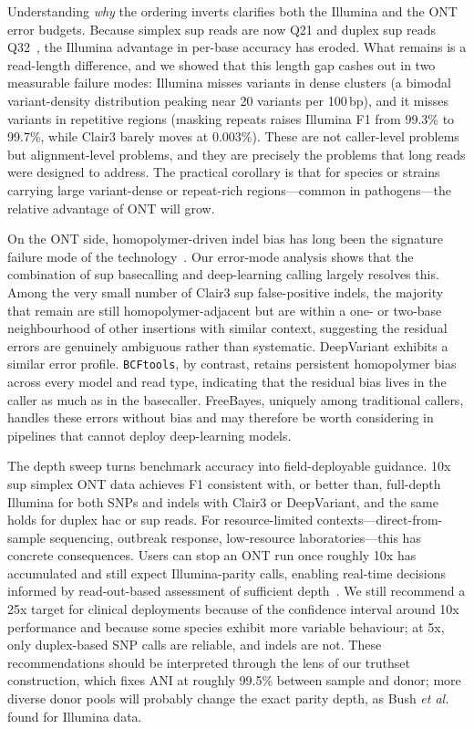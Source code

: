 \documentclass[11pt]{article}
\begin{document}
Understanding \emph{why} the ordering inverts clarifies both the Illumina and the ONT error budgets. Because simplex sup reads are now Q21 and duplex sup reads Q32~\citep{sereika2022oxford,wick2023perfect}, the Illumina advantage in per-base accuracy has eroded. What remains is a read-length difference, and we showed that this length gap cashes out in two measurable failure modes: Illumina misses variants in dense clusters (a bimodal variant-density distribution peaking near 20 variants per 100\,bp), and it misses variants in repetitive regions (masking repeats raises Illumina F1 from 99.3\% to 99.7\%, while Clair3 barely moves at 0.003\%). These are not caller-level problems but alignment-level problems, and they are precisely the problems that long reads were designed to address. The practical corollary is that for species or strains carrying large variant-dense or repeat-rich regions---common in pathogens---the relative advantage of ONT will grow.

On the ONT side, homopolymer-driven indel bias has long been the signature failure mode of the technology~\citep{sereika2022oxford}. Our error-mode analysis shows that the combination of sup basecalling and deep-learning calling largely resolves this. Among the very small number of Clair3 sup false-positive indels, the majority that remain are still homopolymer-adjacent but are within a one- or two-base neighbourhood of other insertions with similar context, suggesting the residual errors are genuinely ambiguous rather than systematic. DeepVariant exhibits a similar error profile. \texttt{BCFtools}, by contrast, retains persistent homopolymer bias across every model and read type, indicating that the residual bias lives in the caller as much as in the basecaller. FreeBayes, uniquely among traditional callers, handles these errors without bias and may therefore be worth considering in pipelines that cannot deploy deep-learning models.

The depth sweep turns benchmark accuracy into field-deployable guidance. 10x sup simplex ONT data achieves F1 consistent with, or better than, full-depth Illumina for both SNPs and indels with Clair3 or DeepVariant, and the same holds for duplex hac or sup reads. For resource-limited contexts---direct-from-sample sequencing, outbreak response, low-resource laboratories---this has concrete consequences. Users can stop an ONT run once roughly 10x has accumulated and still expect Illumina-parity calls, enabling real-time decisions informed by read-out-based assessment of sufficient depth~\citep{quick2016realtime}. We still recommend a 25x target for clinical deployments because of the confidence interval around 10x performance and because some species exhibit more variable behaviour; at 5x, only duplex-based SNP calls are reliable, and indels are not. These recommendations should be interpreted through the lens of our truthset construction, which fixes ANI at roughly 99.5\% between sample and donor; more diverse donor pools will probably change the exact parity depth, as Bush \emph{et al.}~\citep{bush2020genomic} found for Illumina data.
\end{document}
